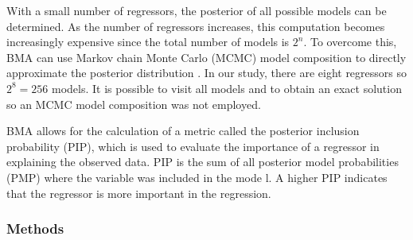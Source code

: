 \documentclass[12pt]{article}
\begin{document}
With a small number of regressors, the posterior of all possible models can be determined. As the number of regressors increases, this computation becomes increasingly expensive since the total number of models is $2^n$. To overcome this, BMA can use Markov chain Monte Carlo (MCMC) model composition to directly approximate the posterior distribution \citep{Wasserman2000}. In our study, there are eight regressors so $2^8 = 256$ models. It is possible to visit all models and to obtain an exact solution so an MCMC model composition was not employed. 

BMA allows for the calculation of a metric called the posterior inclusion probability (PIP), which is used to evaluate the importance of a regressor in explaining the observed data. PIP is the sum of all posterior model probabilities (PMP) where the variable was included in the mode \citep{Zeugner2015}l. A higher PIP indicates that the regressor is more important in the regression.  

\subsubsection{Methods}
\end{document}
